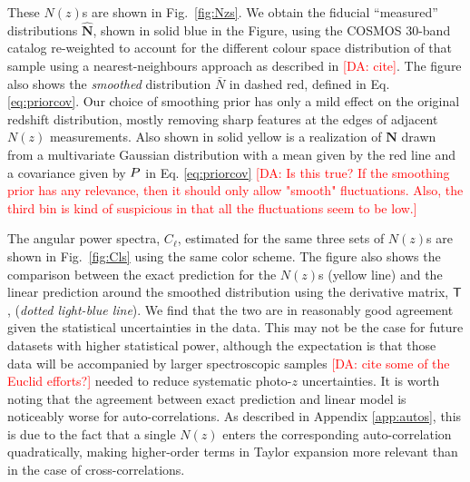 \documentclass[a4paper,11pt]{article}
\newcommand{\da}[1]{{\textcolor{red}{[DA: #1]}}}
\newcommand{\bh}[1]{{\textcolor{teal}{[BH: #1]}}}
\newcommand{\vN}{\mathbf{N}}
\begin{document}
      These $N(z)$s are shown in Fig.~\ref{fig:Nzs}. We obtain the fiducial ``measured'' distributions $\hat{\vN}$, shown in solid blue in the Figure, using the COSMOS 30-band catalog re-weighted to account for the different colour space distribution of that sample using a nearest-neighbours approach as described in \da{cite}. The figure also shows the {\sl smoothed} distribution $\bar{N}$ in dashed red, defined in Eq. \ref{eq:priorcov}. Our choice of smoothing prior has only a mild effect on the original redshift distribution, mostly removing sharp features at the edges of adjacent $N(z)$ measurements. Also shown in solid yellow is a realization of $\vN$ drawn from a multivariate Gaussian distribution with a mean given by the red line and a covariance given by ${\sl P}$ in Eq. \ref{eq:priorcov} \da{Is this true? If the smoothing prior has any relevance, then it should only allow "smooth" fluctuations. Also, the third bin is kind of suspicious in that all the fluctuations seem to be low.}

      
      The angular power spectra, $C_\ell$, estimated for the same three sets of $N(z)$s are shown in Fig.~\ref{fig:Cls} using the same color scheme. The figure also shows the comparison between the exact prediction for the $N(z)$s (yellow line) and the linear prediction around the smoothed distribution using the derivative matrix, ${\sf T}$, (\textit{dotted light-blue line}). We find that the two are in reasonably good agreement given the statistical uncertainties in the data. This may not be the case for future datasets with higher statistical power, although the expectation is that those data will be accompanied by larger spectroscopic samples \da{cite some of the Euclid efforts?} needed to reduce systematic photo-$z$ uncertainties. It is worth noting that the agreement between exact prediction and linear model is noticeably worse for auto-correlations. As described in Appendix \ref{app:autos}, this is due to the fact that a single $N(z)$ enters the corresponding auto-correlation quadratically, making higher-order terms in Taylor expansion more relevant than in the case of cross-correlations.
\end{document}

